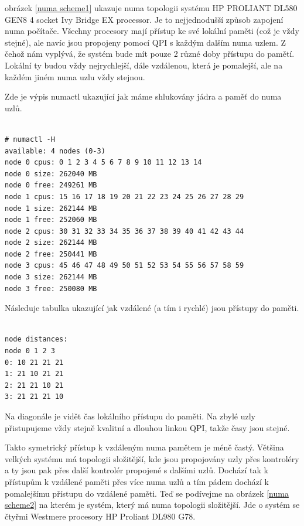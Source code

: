 \documentclass[a4paper,12pt]{article}
\begin{document}
obrázek \ref{numa scheme1} ukazuje numa topologii systému HP PROLIANT DL580 GEN8 4 socket Ivy Bridge EX processor. Je to nejjednodušší způsob zapojení numa počítače. Všechny procesory mají přístup ke své lokální paměti (což je vždy stejné), ale navíc jsou propojeny pomocí QPI s každým dalším numa uzlem. Z čehož nám vyplývá, že systém bude mít pouze 2 různé doby přístupu do pamětí. Lokální ty budou vždy nejrychlejší, dále vzdálenou, která je pomalejší, ale na každém jiném numa uzlu vždy stejnou.

Zde je výpis numactl ukazující jak máme shlukovány jádra a paměť do numa uzlů.

\begin{verbatim} 

# numactl -H
available: 4 nodes (0-3)
node 0 cpus: 0 1 2 3 4 5 6 7 8 9 10 11 12 13 14
node 0 size: 262040 MB
node 0 free: 249261 MB
node 1 cpus: 15 16 17 18 19 20 21 22 23 24 25 26 27 28 29
node 1 size: 262144 MB
node 1 free: 252060 MB
node 2 cpus: 30 31 32 33 34 35 36 37 38 39 40 41 42 43 44
node 2 size: 262144 MB
node 2 free: 250441 MB
node 3 cpus: 45 46 47 48 49 50 51 52 53 54 55 56 57 58 59
node 3 size: 262144 MB
node 3 free: 250080 MB

\end{verbatim}

Následuje tabulka ukazující jak vzdálené (a tím i rychlé) jsou přístupy do paměti.

\begin{verbatim}

node distances:
node 0 1 2 3
0: 10 21 21 21
1: 21 10 21 21
2: 21 21 10 21
3: 21 21 21 10

\end{verbatim}

Na diagonále je vidět čas lokálního přístupu do paměti. Na zbylé uzly přistupujeme vždy stejně kvalitní a dlouhou linkou QPI, takže časy jsou stejné.

Takto symetrický přístup k vzdáleným numa pamětem je méně častý. Většina velkých systému má topologii složitější, kde jsou propojovány uzly přes kontroléry a ty jsou pak přes další kontrolér propojené s dalšími uzlů. Dochází tak k přístupům k vzdálené paměti přes více numa uzlů a tím pádem dochází k pomalejšímu přístupu do vzdálené paměti. Teď se podívejme na obrázek \ref{numa scheme2} na kterém je systém, který má numa topologii složitější. Jde o systém se čtyřmi Westmere procesory HP Proliant DL980 G78.
\end{document}
